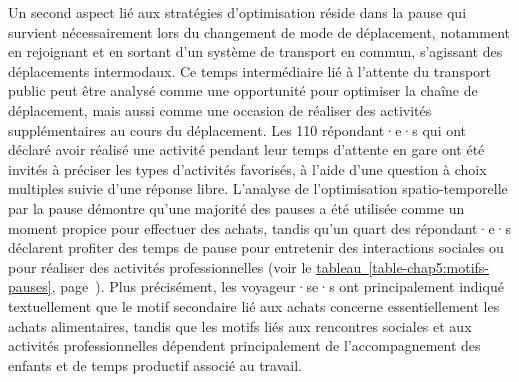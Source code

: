 \begin{refsegment}
Un second aspect lié aux stratégies d'optimisation réside dans la \gls{pause} qui survient nécessairement lors du changement de mode de déplacement, notamment en rejoignant et en sortant d'un système de transport en commun, s'agissant des déplacements intermodaux. Ce temps intermédiaire lié à l'attente du transport public peut être analysé comme une opportunité pour optimiser la chaîne de déplacement, mais aussi comme une occasion de réaliser des activités supplémentaires au cours du déplacement. Les 110 répondant·e·s qui ont déclaré avoir réalisé une activité pendant leur temps d'attente en gare ont été invités à préciser les types d'activités favorisés, à l'aide d'une question à choix multiples suivie d'une réponse libre. L'analyse de l'optimisation spatio-temporelle par la pause démontre qu'une majorité des pauses a été utilisée comme un moment propice pour effectuer des achats, tandis qu'un quart des répondant·e·s déclarent profiter des temps de pause pour entretenir des interactions sociales ou pour réaliser des activités professionnelles (voir le \hyperref[table-chap5:motifs-pauses]{tableau~\ref{table-chap5:motifs-pauses}}, page~\pageref{table-chap5:motifs-pauses}). Plus précisément, les voyageur·se·s ont principalement indiqué textuellement que le motif secondaire lié aux achats concerne essentiellement les achats alimentaires, tandis que les motifs liés aux rencontres sociales et aux activités professionnelles dépendent principalement de l'accompagnement des enfants et de temps productif associé au travail.%



\end{refsegment}
